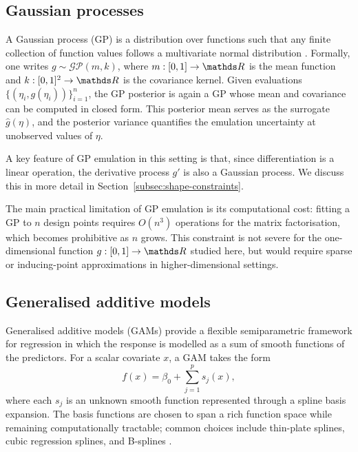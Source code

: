 \subsection{Gaussian processes}
\label{subsec:gp-emulation}

A Gaussian process (GP) is a distribution over functions such that any finite collection of function values follows a multivariate normal distribution \cite{rasmussen2006}.
Formally, one writes $g \sim \mathcal{GP}(m, k)$, where $m: [0,1] \to \bR$ is the mean function and $k: [0,1]^2 \to \bR$ is the covariance kernel.
Given evaluations $\{(\eta_i, g(\eta_i))\}_{i=1}^n$, the GP posterior is again a GP whose mean and covariance can be computed in closed form.
This posterior mean serves as the surrogate $\widehat{g}(\eta)$, and the posterior variance quantifies the emulation uncertainty at unobserved values of $\eta$.

A key feature of GP emulation in this setting is that, since differentiation is a linear operation, the derivative process $g'$ is also a Gaussian process. We discuss this in more detail in Section~\ref{subsec:shape-constraints}.

The main practical limitation of GP emulation is its computational cost: fitting a GP to $n$ design points requires $O(n^3)$ operations for the matrix factorisation, which becomes prohibitive as $n$ grows.
This constraint is not severe for the one-dimensional function $g: [0,1] \to \bR$ studied here, but would require sparse or inducing-point approximations in higher-dimensional settings.



\subsection{Generalised additive models}
\label{subsec:gam-emulation}

Generalised additive models (GAMs) \cite{hastie1986, wood2017} provide a flexible semiparametric framework for regression in which the response is modelled as a sum of smooth functions of the predictors.
For a scalar covariate $x$, a GAM takes the form
\begin{equation}
    f(x) = \beta_0 + \sum_{j=1}^{p} s_j(x),
\end{equation}
where each $s_j$ is an unknown smooth function represented through a spline basis expansion.
The basis functions are chosen to span a rich function space while remaining computationally tractable; common choices include thin-plate splines, cubic regression splines, and B-splines \cite{wood2017}.

